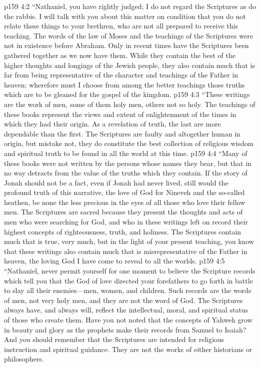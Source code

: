 \pc \vs p159 4:2 \textcolor{ubdarkred}{“Nathaniel, you have rightly judged; I do not regard the Scriptures as do the rabbis. I will talk with you about this matter on condition that you do not relate these things to your brethren, who are not all prepared to receive this teaching. The words of the law of Moses and the teachings of the Scriptures were not in existence before Abraham. Only in recent times have the Scriptures been gathered together as we now have them. While they contain the best of the higher thoughts and longings of the Jewish people, they also contain much that is far from being representative of the character and teachings of the Father in heaven; wherefore must I choose from among the better teachings those truths which are to be gleaned for the gospel of the kingdom.}
\vs p159 4:3 \textcolor{ubdarkred}{“These writings are the work of men, some of them holy men, others not so holy. The teachings of these books represent the views and extent of enlightenment of the times in which they had their origin. As a revelation of truth, the last are more dependable than the first. The Scriptures are faulty and altogether human in origin, but mistake not, they do constitute the best collection of religious wisdom and spiritual truth to be found in all the world at this time.}
\vs p159 4:4 \textcolor{ubdarkred}{“Many of these books were not written by the persons whose names they bear, but that in no way detracts from the value of the truths which they contain. If the story of Jonah should not be a fact, even if Jonah had never lived, still would the profound truth of this narrative, the love of God for Nineveh and the so\hyp{}called heathen, be none the less precious in the eyes of all those who love their fellow men. The Scriptures are sacred because they present the thoughts and acts of men who were searching for God, and who in these writings left on record their highest concepts of righteousness, truth, and holiness. The Scriptures contain much that is true, very much, but in the light of your present teaching, you know that these writings also contain much that is misrepresentative of the Father in heaven, the loving God I have come to reveal to all the worlds.}
\vs p159 4:5 \textcolor{ubdarkred}{“Nathaniel, never permit yourself for one moment to believe the Scripture records which tell you that the God of love directed your forefathers to go forth in battle to slay all their enemies---men, women, and children. Such records are the words of men, not very holy men, and they are not the word of God. The Scriptures always have, and always will, reflect the intellectual, moral, and spiritual status of those who create them. Have you not noted that the concepts of Yahweh grow in beauty and glory as the prophets make their records from Samuel to Isaiah? And you should remember that the Scriptures are intended for religious instruction and spiritual guidance. They are not the works of either historians or philosophers.}
